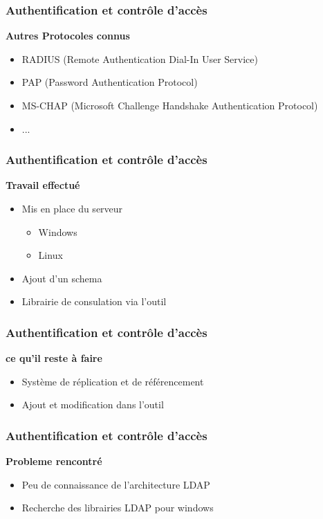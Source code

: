 \begin{frame}
  \frametitle{Authentification et contrôle d'accès}
  \begin{block}{\textbf{Autres Protocoles connus}}
  \begin{itemize}
  \item RADIUS (Remote Authentication Dial-In User Service)
  \item PAP (Password Authentication Protocol)
  \item MS-CHAP (Microsoft Challenge Handshake Authentication Protocol)
  \item ... 
  \end{itemize}
  \end{block}
\end{frame}

\begin{frame}
  \frametitle{Authentification et contrôle d'accès}
  \begin{block}{\textbf{Travail effectué}}
  \begin{itemize}
  \item Mis en place du serveur 
    \begin{itemize}
    \item Windows
    \item Linux
    \end{itemize}
  \item Ajout d'un schema 
  \item Librairie de consulation via l'outil %
  \end{itemize}
  \end{block}
\end{frame}

\begin{frame}
  \frametitle{Authentification et contrôle d'accès}
  \begin{block}{\textbf{ce qu'il reste à faire}}
  \begin{itemize}
  \item Système de réplication et de référencement 
  \item Ajout et modification dans l'outil
  \end{itemize}
  \end{block}
\end{frame}

\begin{frame}
  \frametitle{Authentification et contrôle d'accès}
  \begin{block}{\textbf{Probleme rencontré }}
  \begin{itemize}
  \item Peu de connaissance de l'architecture LDAP
  \item Recherche des librairies LDAP pour windows 
  
  \end{itemize}
  \end{block}
\end{frame}